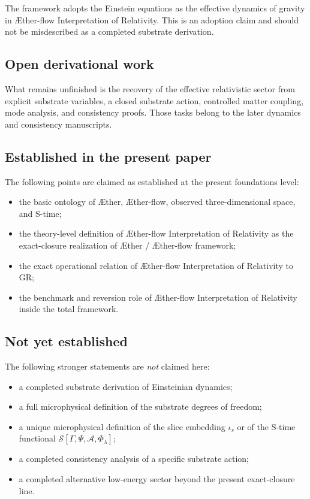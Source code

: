 \documentclass[11pt]{article}
\newcommand{\Aether}{\AE{}ther}
\newcommand{\Aflow}{\AE{}ther-flow}
\newcommand{\TheoryName}{\Aflow{} Interpretation of Relativity}
\newcommand{\TheoryProgram}{\Aether{} / \Aflow{} framework}
\newcommand{\Order}{\mathcal{S}}
\newcommand{\Sub}{\mathcal{A}}
\begin{document}
The framework adopts the Einstein equations as the effective dynamics of gravity in \TheoryName{}. This is an adoption claim and should not be misdescribed as a completed substrate derivation.

\subsection{Open derivational work}

What remains unfinished is the recovery of the effective relativistic sector from explicit substrate variables, a closed substrate action, controlled matter coupling, mode analysis, and consistency proofs. Those tasks belong to the later dynamics and consistency manuscripts.

\subsection{Established in the present paper}

The following points are claimed as established at the present foundations level:
\begin{itemize}
    \item the basic ontology of \Aether{}, \Aflow{}, observed three-dimensional space, and S-time;
    \item the theory-level definition of \TheoryName{} as the exact-closure realization of \TheoryProgram{};
    \item the exact operational relation of \TheoryName{} to GR;
    \item the benchmark and reversion role of \TheoryName{} inside the total framework.
\end{itemize}

\subsection{Not yet established}

The following stronger statements are \emph{not} claimed here:
\begin{itemize}
    \item a completed substrate derivation of Einsteinian dynamics;
    \item a full microphysical definition of the substrate degrees of freedom;
    \item a unique microphysical definition of the slice embedding \(\iota_s\) or of the S-time functional \(\Order[\Gamma,\Psi,\Sub,\Phi_{\lambda}]\);
    \item a completed consistency analysis of a specific substrate action;
    \item a completed alternative low-energy sector beyond the present exact-closure line.
\end{itemize}
\end{document}
